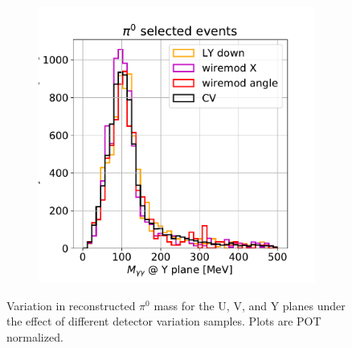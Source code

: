 \documentclass[a4paper]{article}
\begin{document}
\begin{figure}[H]
\begin{center}
\begin{subfigure}[b]{0.3\textwidth}
    \end{subfigure}
    \begin{subfigure}[b]{0.3\textwidth}
    \centering
    \includegraphics[width=1.00\textwidth]{detsys/pi0_mass_Y01162020_bnbnumu.pdf}
    \end{subfigure}
\caption{\label{fig:detsys:dedx:eLEElow}Variation in reconstructed $\pi^0$ mass for the U, V, and Y planes under the effect of different detector variation samples. Plots are POT normalized.}
\end{center}
\end{figure}
\end{document}
